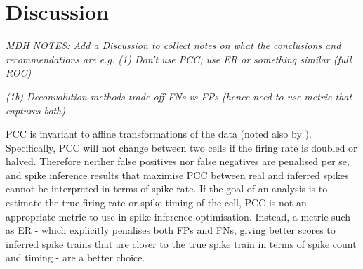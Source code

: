 \documentclass[a4paper,10pt,twocolumn]{article}
\begin{document}









\section{Discussion}
\emph{MDH NOTES: Add a Discussion to collect notes on what the conclusions and recommendations are e.g.
(1) Don’t use PCC; use ER or something similar (full ROC)}

\emph{(1b) Deconvolution methods trade-off FNs vs FPs (hence need to use metric that captures both)}

PCC is invariant to affine transformations of the data (noted also by \citep{Theis2016-ee}). Specifically, PCC will not change between two cells if the firing rate is doubled or halved. Therefore neither false positives nor false negatives are penalised per se, and spike inference results that maximise PCC between real and inferred spikes cannot be interpreted in terms of spike rate. If the goal of an analysis is to estimate the true firing rate or spike timing of the cell, PCC is not an appropriate metric to use in spike inference optimisation. Instead, a metric such as ER - which explicitly penalises both FPs and FNs, giving better scores to inferred spike trains that are closer to the true spike train in terms of spike count and timing - are a better choice.
\end{document}
